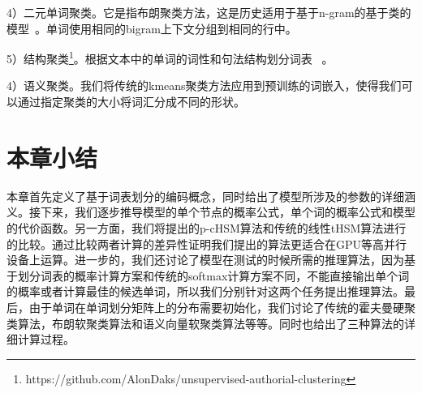 4）二元单词聚类。它是指布朗聚类方法，这是历史适用于基于n-gram的基于类的模型~。单词使用相同的bigram上下文分组到相同的行中。

5）结构聚类\footnote{https://github.com/AlonDaks/unsupervised-authorial-clustering}。根据文本中的单词的词性和句法结构划分词表~ 。

4）语义聚类。我们将传统的kmeans聚类方法应用到预训练的词嵌入，使得我们可以通过指定聚类的大小将词汇分成不同的形状。
\section{本章小结}
本章首先定义了基于词表划分的编码概念，同时给出了模型所涉及的参数的详细涵义。接下来，我们逐步推导模型的单个节点的概率公式，单个词的概率公式和模型的代价函数。另一方面，我们将提出的p-cHSM算法和传统的线性tHSM算法进行的比较。通过比较两者计算的差异性证明我们提出的算法更适合在GPU等高并行设备上运算。进一步的，我们还讨论了模型在测试的时候所需的推理算法，因为基于划分词表的概率计算方案和传统的softmax计算方案不同，不能直接输出单个词的概率或者计算最佳的候选单词，所以我们分别针对这两个任务提出推理算法。最后，由于单词在单词划分矩阵上的分布需要初始化，我们讨论了传统的霍夫曼硬聚类算法，布朗软聚类算法和语义向量软聚类算法等等。同时也给出了三种算法的详细计算过程。